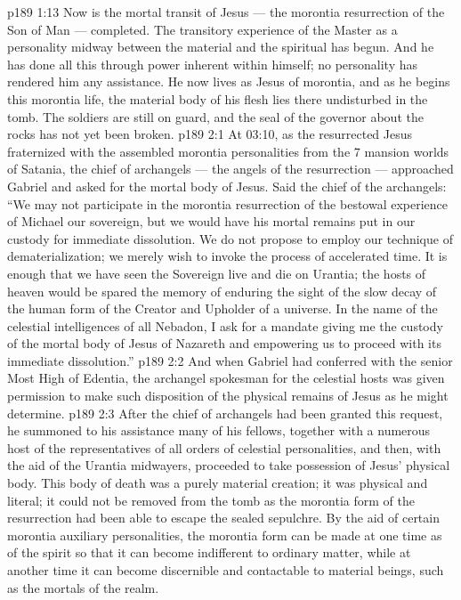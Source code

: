 \vs p189 1:13 Now is the mortal transit of Jesus --- the morontia resurrection of the Son of Man --- completed. The transitory experience of the Master as a personality midway between the material and the spiritual has begun. And he has done all this through power inherent within himself; no personality has rendered him any assistance. He now lives as Jesus of morontia, and as he begins this morontia life, the material body of his flesh lies there undisturbed in the tomb. The soldiers are still on guard, and the seal of the governor about the rocks has not yet been broken.
\vs p189 2:1 At 03:10, as the resurrected Jesus fraternized with the assembled morontia personalities from the 7 mansion worlds of Satania, the chief of archangels --- the angels of the resurrection --- approached Gabriel and asked for the mortal body of Jesus. Said the chief of the archangels: “We may not participate in the morontia resurrection of the bestowal experience of Michael our sovereign, but we would have his mortal remains put in our custody for immediate dissolution. We do not propose to employ our technique of dematerialization; we merely wish to invoke the process of accelerated time. It is enough that we have seen the Sovereign live and die on Urantia; the hosts of heaven would be spared the memory of enduring the sight of the slow decay of the human form of the Creator and Upholder of a universe. In the name of the celestial intelligences of all Nebadon, I ask for a mandate giving me the custody of the mortal body of Jesus of Nazareth and empowering us to proceed with its immediate dissolution.”
\vs p189 2:2 And when Gabriel had conferred with the senior Most High of Edentia, the archangel spokesman for the celestial hosts was given permission to make such disposition of the physical remains of Jesus as he might determine.
\vs p189 2:3 After the chief of archangels had been granted this request, he summoned to his assistance many of his fellows, together with a numerous host of the representatives of all orders of celestial personalities, and then, with the aid of the Urantia midwayers, proceeded to take possession of Jesus’ physical body. This body of death was a purely material creation; it was physical and literal; it could not be removed from the tomb as the morontia form of the resurrection had been able to escape the sealed sepulchre. By the aid of certain morontia auxiliary personalities, the morontia form can be made at one time as of the spirit so that it can become indifferent to ordinary matter, while at another time it can become discernible and contactable to material beings, such as the mortals of the realm.
